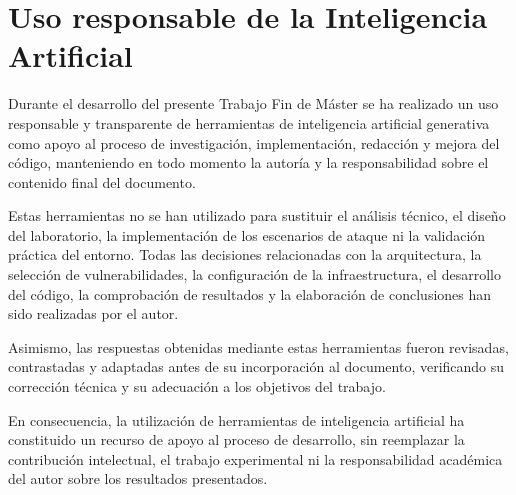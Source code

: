 \clearpage
{}
{}


\section*{Uso responsable de la Inteligencia Artificial}
\label{sec:uso_ia}

Durante el desarrollo del presente Trabajo Fin de Máster se ha realizado un uso responsable y transparente de herramientas de inteligencia artificial generativa como apoyo al proceso de investigación, implementación, redacción y mejora del código, manteniendo en todo momento la autoría y la responsabilidad sobre el contenido final del documento.

Estas herramientas no se han utilizado para sustituir el análisis técnico, el diseño del laboratorio, la implementación de los escenarios de ataque ni la validación práctica del entorno. Todas las decisiones relacionadas con la arquitectura, la selección de vulnerabilidades, la configuración de la infraestructura, el desarrollo del código, la comprobación de resultados y la elaboración de conclusiones han sido realizadas por el autor.

Asimismo, las respuestas obtenidas mediante estas herramientas fueron revisadas, contrastadas y adaptadas antes de su incorporación al documento, verificando su corrección técnica y su adecuación a los objetivos del trabajo.

En consecuencia, la utilización de herramientas de inteligencia artificial ha constituido un recurso de apoyo al proceso de desarrollo, sin reemplazar la contribución intelectual, el trabajo experimental ni la responsabilidad académica del autor sobre los resultados presentados.